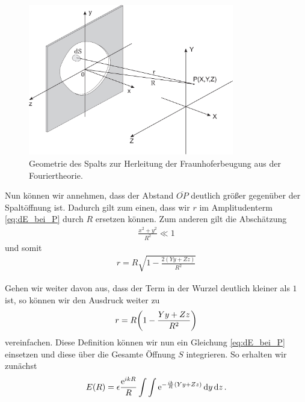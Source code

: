 \begin{figure}[H]
  \centering
    \includegraphics[width=0.8\textwidth]{files/geometrie_herleitung_fourier_fraunhofer.png}
    \caption{Geometrie des Spalts zur Herleitung der Fraunhoferbeugung aus der Fouriertheorie.}
    \label{fig:geometrie_herleitung_fourier_fraunhofer}
\end{figure}

Nun können wir annehmen, dass der Abstand $\overline{OP}$ deutlich größer gegenüber der Spaltöffnung ist. Dadurch gilt zum einen, dass wir $r$ im Amplitudenterm \eqref{eq:dE_bei_P} durch $R$ ersetzen können. Zum anderen gilt die Abschätzung
\begin{align}
  \frac{x^2 + y^2}{R^2} \ll 1
\end{align}
und somit
\begin{align}
  r = R \sqrt{1 - \frac{2(Yy + Zz)}{R^2}}
\end{align}

Gehen wir weiter davon aus, dass der Term in der Wurzel deutlich kleiner als $1$ ist, so können wir den Ausdruck weiter zu
\begin{align}
  r = R\qty(1 - \frac{Yy + Zz}{R^2})
\end{align}
vereinfachen. Diese Definition können wir nun ein Gleichung \eqref{eq:dE_bei_P} einsetzen und diese über die Gesamte Öffnung $S$ integrieren. So erhalten wir zunächst
\begin{align}
  E(R) = \epsilon \frac{\text{e}^{ikR}}{R} \int \int \text{e}^{-\frac{ik}{R}(Yy+Zz)} \dd{y} \dd{z}.
\end{align}

